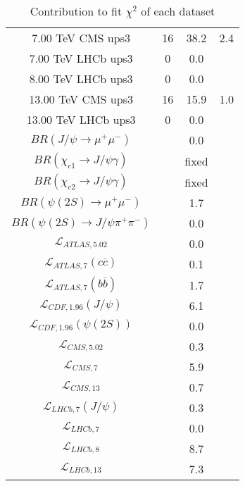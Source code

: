 \begin{table}[h!]
\begin{tabular}{c|c|c|c}
7.00 TeV CMS ups3 & 16 & 38.2 & 2.4 \\
7.00 TeV LHCb ups3 & 0 & 0.0 &  \\
8.00 TeV LHCb ups3 & 0 & 0.0 &  \\
13.00 TeV CMS ups3 & 16 & 15.9 & 1.0 \\
13.00 TeV LHCb ups3 & 0 & 0.0 &  \\
\hline
$BR(J/\psi\rightarrow\mu^+\mu^-)$ &  & 0.0 &  \\
$BR(\chi_{c1}\rightarrow J/\psi\gamma)$ &  & fixed & \\
$BR(\chi_{c2}\rightarrow J/\psi\gamma)$ &  & fixed & \\
$BR(\psi(2S)\rightarrow\mu^+\mu^-)$ &  & 1.7 &  \\
$BR(\psi(2S)\rightarrow J/\psi\pi^+\pi^-)$ &  & 0.0 &  \\
$\mathcal L_{ATLAS,5.02}$ &  & 0.0 &  \\
$\mathcal L_{ATLAS,7}(c\overline c)$ &  & 0.1 &  \\
$\mathcal L_{ATLAS,7}(b\overline b)$ &  & 1.7 &  \\
$\mathcal L_{CDF,1.96}(J/\psi)$ &  & 6.1 &  \\
$\mathcal L_{CDF,1.96}(\psi(2S))$ &  & 0.0 &  \\
$\mathcal L_{CMS,5.02}$ &  & 0.3 &  \\
$\mathcal L_{CMS,7}$ &  & 5.9 &  \\
$\mathcal L_{CMS,13}$ &  & 0.7 &  \\
$\mathcal L_{LHCb,7}(J/\psi)$ &  & 0.3 &  \\
$\mathcal L_{LHCb,7}$ &  & 0.0 &  \\
$\mathcal L_{LHCb,8}$ &  & 8.7 &  \\
$\mathcal L_{LHCb,13}$ &  & 7.3 &  \\
\end{tabular}
\caption{Contribution to fit $\chi^2$ of each dataset}
\end{table}
